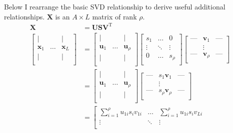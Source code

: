 \documentclass[11pt]{article}
\newcommand{\mbf}{\mathbf}
\begin{document}
\begin{appendices}
Below I rearrange the basic SVD relationship to derive useful additional relationships.  $\mbf{X}$ is an $A  \times L$ matrix of rank $\rho$.%
\begin{align}
\mbf{X}
&=%
\mbf{USV}^\text{T} 
\\
\left[ 
	\begin{matrix}
	| & & | \\
	\mbf{x}_{1} & \ldots  & \mbf{x}_{L}  \\
	| & & | \\
	\end{matrix}
\right] 
&=%
\left[ 
	\begin{matrix}
	| & & | \\
	\mbf{u}_{1} & \ldots  & \mbf{u}_{\rho}  \\
	| & & |  \\
	\end{matrix}
\right]  
\left[ 
	\begin{matrix}
		s_{1} & \ldots & 0  \\
		\vdots & \ddots & \vdots \\
		0 & \ldots & s_{\rho}  \\
	\end{matrix}
\right]
\left[ 
	\begin{matrix}
		\text{---} & \mbf{v}_1 & \text{---} \\
		& \vdots  & \\
		\text{---} & \mbf{v}_\rho & \text{---} \\
	\end{matrix}
\right] 	 
\nonumber \\
&=%
\left[ 
	\begin{matrix}
		| & & | \\
	\mbf{u}_{1} & \ldots  & \mbf{u}_{\rho}  \\
		| & & | \\
	\end{matrix}
\right]  
\left[ 
	\begin{matrix}
		\text{---} & s_{1} \mbf{v}_1 & \text{---} \\
		& \vdots & \\
		\text{---} & s_{\rho} \mbf{v}_\rho & \text{---} \\
	\end{matrix}
\right] 	 
\nonumber \\
&=%
\left[ 
	\begin{matrix}
		\sum_{i=1}^{\rho} u_{1i} s_{i} v_{1i} & \ldots & \sum_{i=1}^{\rho} u_{1i} s_{i} v_{Li} \\
		\vdots & \ddots  & \vdots \\		

\end{matrix}
\end{align}
\end{appendices}
\end{document}
